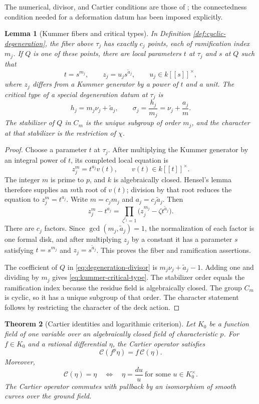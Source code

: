 \documentclass[10pt,a4paper]{amsart}
\newtheorem{theorem}{Theorem}[section]
\newtheorem{lemma}[theorem]{Lemma}
\numberwithin{equation}{section}
\begin{document}
The numerical, divisor, and Cartier conditions are those of
\cite[Definition~3.1 and equations~(29)--(30)]{WewersMeta}; the connectedness
condition needed for a deformation datum has been imposed explicitly.

\begin{lemma}[Kummer fibers and critical types]
\label{lem:kummer-critical-type}
In Definition \ref{def:cyclic-degeneration}, the fiber above $\tau_j$ has
exactly $c_j$ points, each of ramification index $m_j$.  If $Q$ is one of
these points, there are local parameters $t$ at $\tau_j$ and $s$ at $Q$
such that
\[
 t=s^{m_j},\qquad z_j=u_js^{\widetilde a_j},\qquad
 u_j\in k[[s]]^\times,
\]
where $z_j$ differs from a Kummer generator by a power of $t$ and a unit.
The critical type of a special degeneration datum at $\tau_j$ is
\[
 h_j=m_j\nu_j+\widetilde a_j,
 \qquad
 \sigma_j=\frac{h_j}{m_j}=\nu_j+\frac{a_j}{m}.
 \label{eq:kummer-critical-type}
\]
The stabilizer of $Q$ in $C_m$ is the unique subgroup of order $m_j$, and
the character at that stabilizer is the restriction of $\chi$.
\end{lemma}

\begin{proof}
Choose a parameter $t$ at $\tau_j$.  After multiplying the Kummer generator
by an integral power of $t$, its completed local equation is
\[
 z_j^m=t^{a_j}v(t),\qquad v(t)\in k[[t]]^\times.
\]
The integer $m$ is prime to $p$, and $k$ is algebraically closed.  Hensel's
lemma therefore supplies an $m$th root of $v(t)$; division by that root
reduces the equation to $z_j^m=t^{a_j}$.  Write
$m=c_jm_j$ and $a_j=c_j\widetilde a_j$.  Then
\[
 z_j^m-t^{a_j}
 =\prod_{\zeta^{c_j}=1}
   \bigl(z_j^{m_j}-\zeta t^{\widetilde a_j}\bigr).
\]
There are $c_j$ factors.  Since
$\gcd(m_j,\widetilde a_j)=1$, the normalization of each factor is one
formal disk, and after multiplying $z_j$ by a constant it has a parameter
$s$ satisfying $t=s^{m_j}$ and $z_j=s^{\widetilde a_j}$.  This proves the
fiber and ramification assertions.

The coefficient of $Q$ in \eqref{eq:degeneration-divisor} is
$m_j\nu_j+\widetilde a_j-1$.  Adding one and dividing by $m_j$ gives
\eqref{eq:kummer-critical-type}.  The stabilizer order equals the
ramification index because the residue field is algebraically closed.
The group $C_m$ is cyclic, so it has a unique subgroup of that order.  The
character statement follows by restricting the character of the deck
action.
\end{proof}

\begin{theorem}[Cartier identities and logarithmic criterion]
\label{thm:cartier-criterion}
Let $K_0$ be a function field of one variable over an algebraically closed
field of characteristic $p$.  For $f\in K_0$ and a rational differential $\eta$,
the Cartier operator satisfies
\[
 \mathcal C(f^p\eta)=f\,\mathcal C(\eta).
\]
Moreover,
\[
 \mathcal C(\eta)=\eta
 \quad\Longleftrightarrow\quad
 \eta=\frac{du}{u}\ \text{for some }u\in K_0^\times.
\]
The Cartier operator commutes with pullback by an isomorphism of smooth
curves over the ground field.
\end{theorem}
\end{document}
